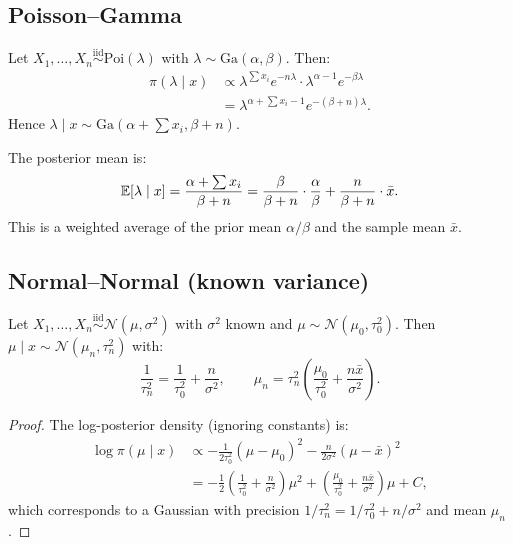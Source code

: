 \subsection{Poisson--Gamma}

\begin{example}
Let $X_1, \ldots, X_n \overset{\text{iid}}{\sim} \text{Poi}(\lambda)$
with $\lambda \sim \text{Ga}(\alpha, \beta)$. Then:
\begin{align*}
  \pi(\lambda \mid x) &\propto
  \lambda^{\sum x_i} e^{-n\lambda} \cdot \lambda^{\alpha-1} e^{-\beta\lambda} \\
  &= \lambda^{\alpha + \sum x_i - 1} e^{-(\beta + n)\lambda}.
\end{align*}
Hence $\lambda \mid x \sim \text{Ga}(\alpha + \sum x_i, \beta + n)$.

The posterior mean is:
\[
  \mathbb{E}[\lambda \mid x] = \frac{\alpha + \sum x_i}{\beta + n}
  = \frac{\beta}{\beta + n} \cdot \frac{\alpha}{\beta}
  + \frac{n}{\beta + n} \cdot \bar{x}.
\]
This is a weighted average of the prior mean $\alpha/\beta$ and the
sample mean $\bar{x}$.
\end{example}

\subsection{Normal--Normal (known variance)}

\begin{theorem}
Let $X_1, \ldots, X_n \overset{\text{iid}}{\sim} \mathcal{N}(\mu, \sigma^2)$
with $\sigma^2$ known and $\mu \sim \mathcal{N}(\mu_0, \tau_0^2)$.
Then $\mu \mid x \sim \mathcal{N}(\mu_n, \tau_n^2)$ with:
\[
  \frac{1}{\tau_n^2} = \frac{1}{\tau_0^2} + \frac{n}{\sigma^2},
  \qquad
  \mu_n = \tau_n^2\left(\frac{\mu_0}{\tau_0^2} + \frac{n\bar{x}}{\sigma^2}\right).
\]
\end{theorem}

\begin{proof}
The log-posterior density (ignoring constants) is:
\begin{align*}
  \log \pi(\mu \mid x)
  &\propto -\frac{1}{2\tau_0^2}(\mu - \mu_0)^2
  - \frac{n}{2\sigma^2}(\mu - \bar{x})^2 \\
  &= -\frac{1}{2}\left(\frac{1}{\tau_0^2} + \frac{n}{\sigma^2}\right)
  \mu^2 + \left(\frac{\mu_0}{\tau_0^2} + \frac{n\bar{x}}{\sigma^2}\right)\mu
  + C,
\end{align*}
which corresponds to a Gaussian with precision
$1/\tau_n^2 = 1/\tau_0^2 + n/\sigma^2$ and mean $\mu_n$.
\end{proof}

